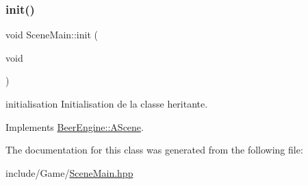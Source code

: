 \subsubsection{\texorpdfstring{init()}{init()}}
{\footnotesize\ttfamily void Scene\+Main\+::init (\begin{DoxyParamCaption}\item[{void}]{ }\end{DoxyParamCaption})\hspace{0.3cm}{\ttfamily [virtual]}}



initialisation Initialisation de la classe heritante. 



Implements \mbox{\hyperlink{class_beer_engine_1_1_a_scene_a7a55b4e506ae618e6596ae812ad48db0}{Beer\+Engine\+::\+A\+Scene}}.



The documentation for this class was generated from the following file\+:\begin{DoxyCompactItemize}
\item 
include/\+Game/\mbox{\hyperlink{_scene_main_8hpp}{Scene\+Main.\+hpp}}\end{DoxyCompactItemize}
